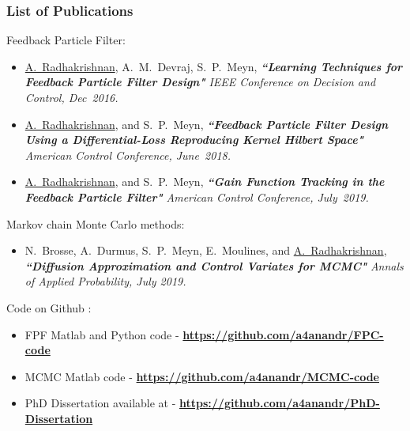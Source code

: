 \documentclass[xcolor=dvipsnames, subsection=false]{beamer}
\begin{document}
\begin{frame}
\frametitle{List of Publications}
\begin{minipage}[t][10cm][t]{\textwidth}
	\vspace{-0.2in}
			\begin{block}{\scriptsize Feedback Particle Filter:}
				\begin{itemize}
					\item {\tiny { {\underline{A.~Radhakrishnan}}, A.~M.~Devraj, S.~P.~Meyn, {\bf \textit{``Learning Techniques for Feedback Particle Filter Design"}} {{\emph{{IEEE Conference on Decision and Control, Dec~2016.}}}}}}
					\item {\tiny { {\underline{A.~Radhakrishnan}}, and S.~P.~Meyn, {\bf \textit{``Feedback Particle Filter Design Using a Differential-Loss Reproducing Kernel Hilbert Space"}} {{\emph{{American Control Conference, June~2018.}}}}}}
						\item {\tiny { {\underline{A.~Radhakrishnan}}, and S.~P.~Meyn, {\bf \textit{``Gain Function Tracking in the Feedback Particle Filter"}} {{\emph{{American Control Conference, July~2019.}}}}}}
				\end{itemize}
			\end{block}
				\begin{alertblock}{\scriptsize Markov chain Monte Carlo methods:}
					\begin{itemize}
						\item {\tiny { N.~Brosse, A.~Durmus,  S.~P.~Meyn, E.~Moulines, and {\underline{A.~Radhakrishnan}}, {\bf \textit{``Diffusion Approximation and Control Variates for MCMC"}} {{\emph{{Annals of Applied Probability, July 2019.}}}}}}	
					\end{itemize}
				\end{alertblock}
\begin{block}{\scriptsize Code on Github {\faGithub}:}
\begin{itemize}
	\item {\tiny FPF Matlab and Python code - {\bf \href{https://github.com/a4anandr/FPF-code}{https://github.com/a4anandr/FPC-code}}}
	\item {\tiny MCMC Matlab code - {\bf \href{https://github.com/a4anandr/MCMC-code}{https://github.com/a4anandr/MCMC-code}}}
	\item {\tiny PhD Dissertation available at - {\bf \href{https://github.com/a4anandr/PhDDissertation}{https://github.com/a4anandr/PhD-Dissertation}}}
\end{itemize}
\end{block}
\end{minipage}
\end{frame}
\end{document}
